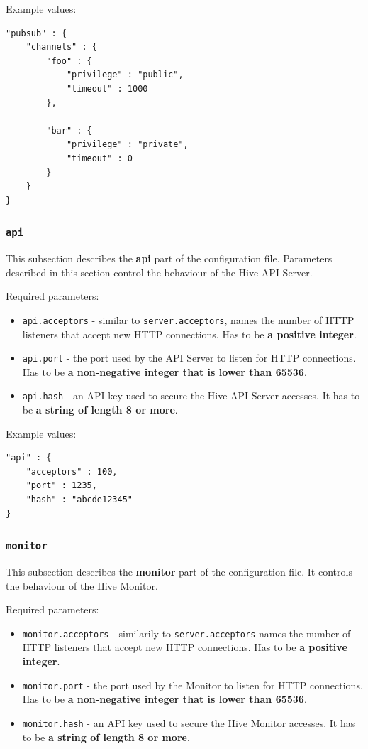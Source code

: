 \documentclass[a4paper]{article}
\begin{document}
\noindent
Example values:


\begin{verbatim}
"pubsub" : {
    "channels" : {
        "foo" : {
            "privilege" : "public",
            "timeout" : 1000
        },

        "bar" : {
            "privilege" : "private",
            "timeout" : 0
        }
    }
}
\end{verbatim}
\subsubsection{\texttt{api}}
\label{sec-3-1-6}
\label{ref-api_config}

This subsection describes the \textbf{api} part of the configuration file. Parameters described in this section control the behaviour of the Hive API Server.

\noindent
Required parameters:

\begin{itemize}
\item \texttt{api.acceptors} - similar to \texttt{server.acceptors}, names the number of HTTP listeners that accept new HTTP connections. Has to be \textbf{a positive integer}.
\item \texttt{api.port} - the port used by the API Server to listen for HTTP connections. Has to be \textbf{a non-negative integer that is lower than 65536}.
\item \texttt{api.hash} - an API key used to secure the Hive API Server accesses. It has to be \textbf{a string of length 8 or more}.
\end{itemize}

\noindent
Example values:

\begin{verbatim}
"api" : {
    "acceptors" : 100,
    "port" : 1235,
    "hash" : "abcde12345"
}
\end{verbatim}
\subsubsection{\texttt{monitor}}
\label{sec-3-1-7}
\label{ref-monitor_config}

This subsection describes the \textbf{monitor} part of the configuration file. It controls the behaviour of the Hive Monitor.

\noindent
Required parameters:

\begin{itemize}
\item \texttt{monitor.acceptors} - similarily to \texttt{server.acceptors} names the number of HTTP listeners that accept new HTTP connections. Has to be \textbf{a positive integer}.
\item \texttt{monitor.port} - the port used by the Monitor to listen for HTTP connections. Has to be \textbf{a non-negative integer that is lower than 65536}.
\item \texttt{monitor.hash} - an API key used to secure the Hive Monitor accesses. It has to be \textbf{a string of length 8 or more}.
\end{itemize}
\end{document}
